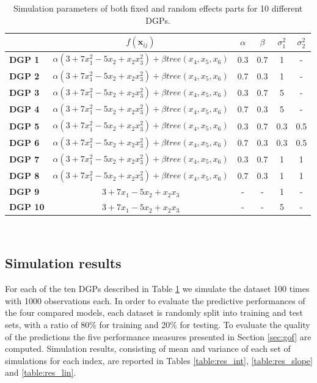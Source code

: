\begin{table}[H]
    \centering 
    \begin{tabular}{|p{4em} | c | c | c | c | c |}
    \hline
    \rowcolor{bluePoli!40}
    & \textbf{\(f(\bm{x}_{ij})\)} & \textbf{\(\alpha\)} & \textbf{\(\beta\)} & \textbf{\(\sigma^2_1\)} & \textbf{\(\sigma^2_2\)} \T\B \\
    \hline \hline
    \textbf{DGP 1} & \(\alpha(3+7x_{1}^2-5x_{2}+x_{2}x_{3}^2) + \beta tree(x_{4},x_{5},x_{6})\) & 0.3 & 0.7 & 1 & - \T\B \\
    \textbf{DGP 2} & \(\alpha(3+7x_{1}^2-5x_{2}+x_{2}x_{3}^2) + \beta tree(x_{4},x_{5},x_{6})\) & 0.7 & 0.3 & 1 & - \T\B \\
    \textbf{DGP 3} & \(\alpha(3+7x_{1}^2-5x_{2}+x_{2}x_{3}^2) + \beta tree(x_{4},x_{5},x_{6})\) & 0.3 & 0.7 & 5 & - \T\B \\
    \textbf{DGP 4} & \(\alpha(3+7x_{1}^2-5x_{2}+x_{2}x_{3}^2) + \beta tree(x_{4},x_{5},x_{6})\) & 0.7 & 0.3 & 5 & - \T\B \\
    \textbf{DGP 5} & \(\alpha(3+7x_{1}^2-5x_{2}+x_{2}x_{3}^2) + \beta tree(x_{4},x_{5},x_{6})\) & 0.3 & 0.7 & 0.3 & 0.5 \T\B \\
    \textbf{DGP 6} & \(\alpha(3+7x_{1}^2-5x_{2}+x_{2}x_{3}^2) + \beta tree(x_{4},x_{5},x_{6})\) & 0.7 & 0.3 & 0.3 & 0.5 \T\B \\
    \textbf{DGP 7} & \(\alpha(3+7x_{1}^2-5x_{2}+x_{2}x_{3}^2) + \beta tree(x_{4},x_{5},x_{6})\) & 0.3 & 0.7 & 1 & 1 \T\B \\
    \textbf{DGP 8} & \(\alpha(3+7x_{1}^2-5x_{2}+x_{2}x_{3}^2) + \beta tree(x_{4},x_{5},x_{6})\) & 0.7 & 0.3 & 1 & 1 \T\B \\
    \textbf{DGP 9} & \(3+7x_{1}-5x_{2}+x_{2}x_{3}\) & - & - & 1 & - \T\B \\
    \textbf{DGP 10} & \(3+7x_{1}-5x_{2}+x_{2}x_{3}\) & - & - & 5 & - \B \\
    \hline
    \end{tabular}
    \\[10pt]
    \caption{Simulation parameters of both fixed and random effects parts for 10 different DGPs.}
    \label{table:DGPs}
\end{table}

\subsection{Simulation results}
\label{sec:simres}
For each of the ten DGPs described in Table \ref{table:DGPs} we simulate the dataset 100 times with 1000 observations each. In order to evaluate the predictive performances of the four compared models, each dataset is randomly split into training and test sets, with a ratio of 80\% for training and 20\% for testing.
To evaluate the quality of the predictions the five performance measures presented in Section \ref{sec:gof} are computed. Simulation results, consisting of mean and variance of each set of simulations for each index,  are reported in Tables \ref{table:res_int}, \ref{table:res_slope} and \ref{table:res_lin}.

